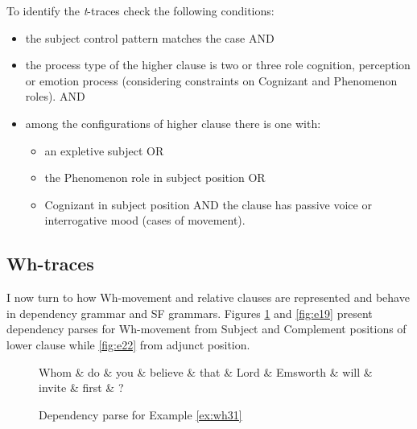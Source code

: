 \begin{generalization}\label{gen:trace-detection}
    To identify the \textit{t}-traces check the following conditions:
    \begin{itemize}
        \item the subject control pattern matches the case AND
        \item the process type of the higher clause is two or three role cognition, perception or emotion process (considering constraints on Cognizant and Phenomenon roles). AND
        \item among the configurations of higher clause there is one with:
        \begin{itemize}
            \item an expletive subject OR
            \item the Phenomenon role in subject position OR
            \item Cognizant in subject position AND the clause has passive voice or interrogative mood (cases of movement).
        \end{itemize}
    \end{itemize}
\end{generalization}


\subsection{Wh-traces}
\label{sec:wh-traces}
I now turn to how Wh-movement and relative clauses are represented and behave in dependency grammar and SF grammars. Figures \ref{fig:e18} and \ref{fig:e19} present dependency parses for Wh-movement from Subject and Complement positions of lower clause while \ref{fig:e22} from adjunct position.

\begin{figure}[!ht]
	\centering
	\begin{dependency}
		\begin{deptext}[]
			Whom \& do \& you \& believe \& that \& Lord \& Emsworth \& will \& invite \& first \& ?\\
		\end{deptext}
	\end{dependency}
	\caption{Dependency parse for Example \ref{ex:wh31}}
	\label{fig:e18}
\end{figure}

